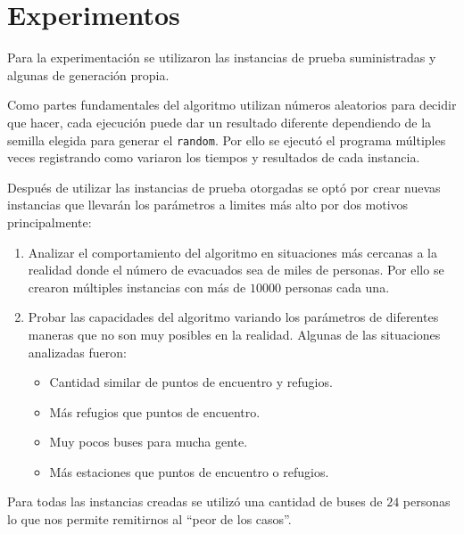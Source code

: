 \documentclass[letter, 10pt]{article}
\begin{document}
\section{Experimentos}\label{sec:exp}
    Para la experimentación se utilizaron las instancias de prueba
    suministradas y algunas de generación propia.

    Como partes fundamentales del algoritmo utilizan números aleatorios para
    decidir que hacer, cada ejecución puede dar un resultado diferente
    dependiendo de la semilla elegida para generar el \texttt{random}. Por ello
    se ejecutó el programa múltiples veces registrando como variaron los
    tiempos y resultados de cada instancia.

    Después de utilizar las instancias de prueba otorgadas se optó por crear
    nuevas instancias que llevarán los parámetros a limites más alto por dos
    motivos principalmente:
    \begin{enumerate}
        \item 
            Analizar el comportamiento del algoritmo en situaciones más
            cercanas a la realidad donde el número de evacuados sea de miles de
            personas.
            Por ello se crearon múltiples instancias con más de $10000$
            personas cada una.
        \item
            Probar las capacidades del algoritmo variando los parámetros de
            diferentes maneras que no son muy posibles en la realidad. Algunas
            de las situaciones analizadas fueron:
            \begin{itemize}
                \item
                    Cantidad similar de puntos de encuentro y refugios.
                \item
                    Más refugios que puntos de encuentro.
                \item
                    Muy pocos buses para mucha gente.
                \item
                    Más estaciones que puntos de encuentro o refugios.
            \end{itemize}
    \end{enumerate}

    Para todas las instancias creadas se utilizó una cantidad de buses de $24$
    personas lo que nos permite remitirnos al ``peor de los casos''.
\end{document}
